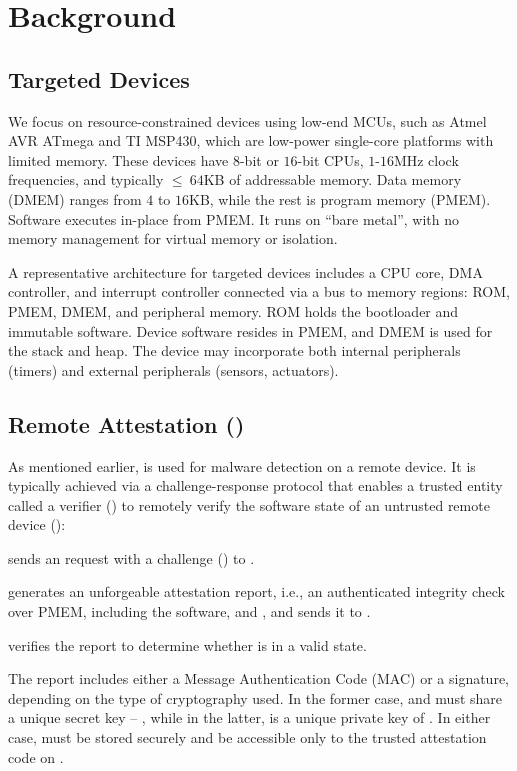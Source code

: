 \section{Background}\label{sec:bg}
%
\subsection{Targeted Devices}
We focus on resource-constrained devices using low-end MCUs, such as Atmel AVR ATmega and TI MSP430, 
which are low-power single-core platforms with limited memory. These devices have $8$-bit or $16$-bit 
CPUs, $1$-$16$MHz clock frequencies, and typically $\leq~64$KB of addressable memory. Data memory
(DMEM) ranges from $4$ to $16$KB, while the rest is program memory (PMEM). Software executes in-place
from PMEM. It runs on ``bare metal'',  with no memory management for virtual memory or isolation.

A representative architecture for targeted devices includes a CPU core, DMA controller, and 
interrupt controller connected via a bus to memory regions: ROM, PMEM, DMEM, and peripheral 
memory. ROM holds the bootloader and immutable software. Device software resides in PMEM, 
and DMEM is used for the stack and heap. The device may incorporate both internal peripherals (timers) and external peripherals (sensors, actuators).

\subsection{Remote Attestation (\ra)}
%
As mentioned earlier, \ra is used for malware detection on a remote device. It is typically
achieved via a challenge-response protocol that enables a trusted entity called a verifier (\vrf) 
to remotely verify the software state of an untrusted remote device (\prv):
\begin{compactenum}  
  \item \vrf sends an \ra request with a challenge (\chal) to \prv.
  \item \prv generates an unforgeable attestation report, i.e., an authenticated integrity check 
  over PMEM, including the software, and \chal, and sends it to \vrf.
  \item \vrf verifies the report to determine whether \prv is in a valid state.
\end{compactenum}
%
The report includes either a Message Authentication Code (MAC) or a signature, depending 
on the type of cryptography used. In the former case, \prv and \vrf must share a unique 
secret key -- \key, while in the latter, \key is a unique private key of \prv. In either case, 
\key must be stored securely and be accessible only to the trusted 
attestation code on \prv.  


